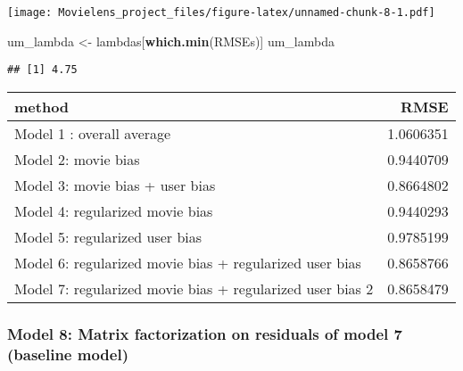 \documentclass[
]{article}
\newenvironment{Shaded}{\begin{snugshade}}{\end{snugshade}}
\newcommand{\DataTypeTok}[1]{\textcolor[rgb]{0.13,0.29,0.53}{#1}}
\newcommand{\DecValTok}[1]{\textcolor[rgb]{0.00,0.00,0.81}{#1}}
\newcommand{\KeywordTok}[1]{\textcolor[rgb]{0.13,0.29,0.53}{\textbf{#1}}}
\newcommand{\NormalTok}[1]{#1}
\newcommand{\OperatorTok}[1]{\textcolor[rgb]{0.81,0.36,0.00}{\textbf{#1}}}
\newcommand{\StringTok}[1]{\textcolor[rgb]{0.31,0.60,0.02}{#1}}
\begin{document}
\texttt{[image: Movielens\_project\_files/figure-latex/unnamed-chunk-8-1.pdf]}

\begin{Shaded}
\begin{Highlighting}[]
\NormalTok{um_lambda <-}\StringTok{ }\NormalTok{lambdas[}\KeywordTok{which.min}\NormalTok{(RMSEs)]}
\NormalTok{um_lambda}
\end{Highlighting}
\end{Shaded}

\begin{verbatim}
## [1] 4.75
\end{verbatim}

\begin{Shaded}
\end{Shaded}

\begin{longtable}[]{@{}lr@{}}
\toprule
method & RMSE\tabularnewline
\midrule
\endhead
Model 1 : overall average & 1.0606351\tabularnewline
Model 2: movie bias & 0.9440709\tabularnewline
Model 3: movie bias + user bias & 0.8664802\tabularnewline
Model 4: regularized movie bias & 0.9440293\tabularnewline
Model 5: regularized user bias & 0.9785199\tabularnewline
Model 6: regularized movie bias + regularized user bias &
0.8658766\tabularnewline
Model 7: regularized movie bias + regularized user bias 2 &
0.8658479\tabularnewline
\bottomrule
\end{longtable}

\hypertarget{model-8-matrix-factorization-on-residuals-of-model-7-baseline-model}{%
\subsubsection{Model 8: Matrix factorization on residuals of model 7
(baseline
model)}\label{model-8-matrix-factorization-on-residuals-of-model-7-baseline-model}}
\end{document}

